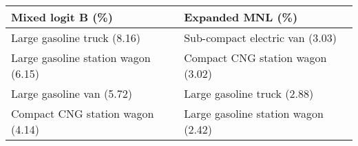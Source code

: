 \begin{tabularx}{0.75\textwidth}{QQ}
\toprule
Mixed logit B (\%)                &           Expanded MNL (\%)    \\

\midrule

Large gasoline truck \newline (8.16)  &  Sub-compact electric van \newline (3.03) \\
Large gasoline station wagon \newline (6.15)  &  Compact CNG station wagon \newline (3.02)  \\
Large gasoline van \newline (5.72)  &  Large gasoline truck \newline (2.88) \\
Compact CNG station wagon \newline (4.14)  &  Large gasoline station wagon \newline (2.42) \\

\bottomrule
\end{tabularx}
